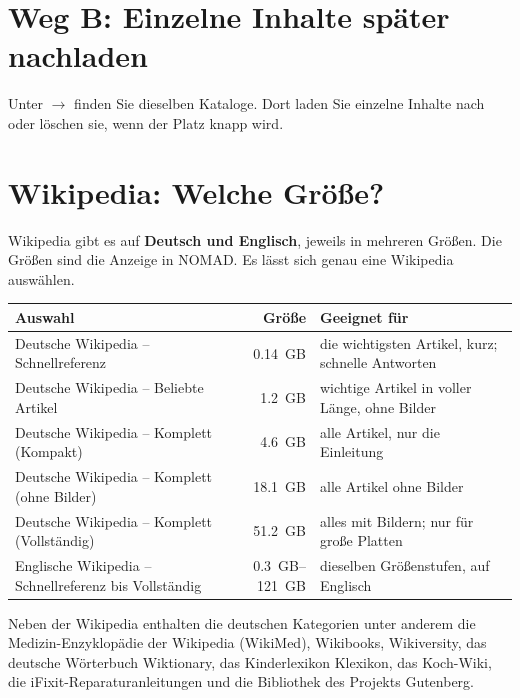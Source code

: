 \section{Weg B: Einzelne Inhalte später nachladen}
Unter  $\rightarrow$  finden Sie dieselben Kataloge. Dort laden Sie einzelne Inhalte nach oder löschen sie, wenn der Platz knapp wird.

\section{Wikipedia: Welche Größe?}
Wikipedia gibt es auf \textbf{Deutsch und Englisch}, jeweils in mehreren Größen. Die Größen sind die Anzeige in NOMAD. Es lässt sich genau eine Wikipedia auswählen.

\begin{center}\small
\renewcommand{\arraystretch}{1.25}
\begin{tabularx}{\linewidth}{@{}>{\RaggedRight\arraybackslash}p{5.6cm}rX@{}}
\toprule
\textbf{Auswahl} & \textbf{Größe} & \textbf{Geeignet für} \\
\midrule
Deutsche Wikipedia – Schnellreferenz & \SI{0,14}{GB} & die wichtigsten Artikel, kurz; schnelle Antworten \\
Deutsche Wikipedia – Beliebte Artikel & \SI{1,2}{GB} & wichtige Artikel in voller Länge, ohne Bilder \\
Deutsche Wikipedia – Komplett (Kompakt) & \SI{4,6}{GB} & alle Artikel, nur die Einleitung \\
Deutsche Wikipedia – Komplett (ohne Bilder) & \SI{18,1}{GB} & alle Artikel ohne Bilder \\
Deutsche Wikipedia – Komplett (Vollständig) & \SI{51,2}{GB} & alles mit Bildern; nur für große Platten \\
\midrule
Englische Wikipedia – Schnellreferenz bis Vollständig & \SIrange{0,3}{121}{GB} & dieselben Größenstufen, auf Englisch \\
\bottomrule
\end{tabularx}
\end{center}

Neben der Wikipedia enthalten die deutschen Kategorien unter anderem die Medizin-Enzyklopädie der Wikipedia (WikiMed), Wikibooks, Wikiversity, das deutsche Wörterbuch Wiktionary, das Kinderlexikon Klexikon, das Koch-Wiki, die iFixit-Reparaturanleitungen und die Bibliothek des Projekts Gutenberg.

